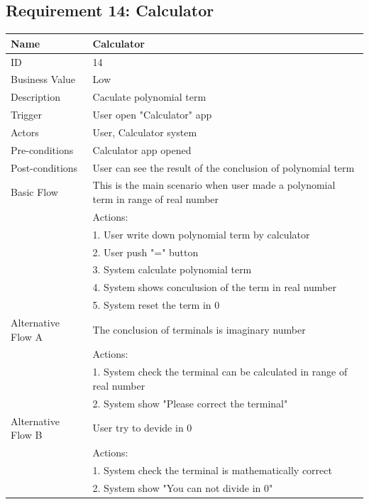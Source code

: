 \documentclass{article}
\begin{document}
		\subsection{Requirement 14: Calculator}
		\begin{table}[htbp]
			\centering
			\small
			\begin{tabularx}{\textwidth}{|>{\raggedright\arraybackslash}p{}|X|}
				\hline
				Name             & Calculator                                \\ \hline
				ID               & 14                                                                                       \\ \hline
				Business Value   & Low                                                                                    \\ \hline
				Description      & Caculate polynomial term \\ \hline
				Trigger          & User open "Calculator" app \\ \hline
				Actors           & User, Calculator system                                \\ \hline
				Pre-conditions   & Calculator app opened                                    \\ \hline
				Post-conditions  & User can see the result of the conclusion of polynomial term                                              \\ \hline
				Basic Flow       & This is the main scenario when user made a polynomial term in range of real number \\ \hline
								 & Actions: \\
								 & 1. User write down polynomial term by calculator \\
								 & 2. User push "=" button \\
								 & 3. System calculate polynomial term \\
								 & 4. System shows conculusion of the term in real number \\
								 & 5. System reset the term in 0 \\ \hline
				Alternative Flow A & The conclusion of terminals is imaginary number \\
								 & Actions: \\
								 & 1. System check the terminal can be calculated in range of real number \\
								 & 2. System show "Please correct the terminal" \\ \hline
				Alternative Flow B & User try to devide in 0 \\
								 & Actions: \\
								 & 1. System check the terminal is mathematically correct  \\
								 & 2. System show "You can not divide in 0" \\ \hline
			\end{tabularx}
		\end{table}
\end{document}
